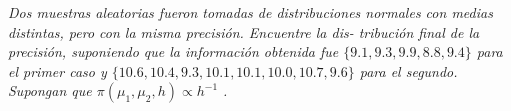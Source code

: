 \documentclass[11pt,letterpaper]{article}
\begin{document}
\begin{tcolorbox}[
    title = \textcolor{white}{\textbf{Problema 3}},
    colbacktitle=AzulUNAM!95!black,         %
    coltitle=white,                         %
    colback=OroUNAM!7!white,                %
    colframe=OroUNAM!90!black,              %
    fontupper=\small
]
\textit{Dos muestras aleatorias fueron tomadas de distribuciones normales
con medias distintas, pero con la misma precisi\'on. Encuentre la dis-
tribuci\'on final de la precisi\'on, suponiendo que la información obtenida
fue $\{9.1, 9.3, 9.9, 8.8, 9.4\}$ para el primer caso y $\{10.6, 10.4, 9.3, 10.1,
10.1, 10.0, 10.7, 9.6\}$ para el segundo. Supongan que $\pi(\mu_1,\mu_2,h) \propto h^{-1}$
.}
\end{tcolorbox}
\end{document}

